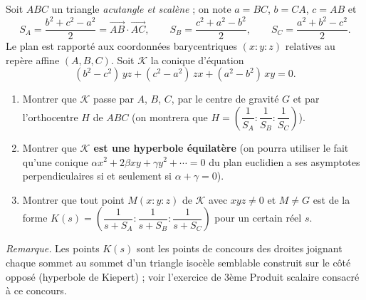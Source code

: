 
\newcommand{\R}{\mathbb{R}}

Soit $ABC$ un triangle \emph{acutangle et scalène} ; on note $a=BC$, $b=CA$, $c=AB$ et
\[S_A=\dfrac{b^2+c^2-a^2}{2}=\overrightarrow{AB}\cdot\overrightarrow{AC},\qquad S_B=\dfrac{c^2+a^2-b^2}{2},\qquad S_C=\dfrac{a^2+b^2-c^2}{2}.\]
Le plan est rapporté aux coordonnées barycentriques $(x:y:z)$ relatives au repère affine $(A,B,C)$. Soit $\mathcal K$ la conique d'équation
\[(b^2-c^2)\,yz+(c^2-a^2)\,zx+(a^2-b^2)\,xy=0.\]

\begin{enumerate}
  \item Montrer que $\mathcal K$ passe par $A$, $B$, $C$, par le centre de gravité $G$ et par l'orthocentre $H$ de $ABC$ (on montrera que $H=\left(\dfrac1{S_A}:\dfrac1{S_B}:\dfrac1{S_C}\right)$).
  \item Montrer que \textbf{$\mathcal K$ est une hyperbole équilatère} (on pourra utiliser le fait qu'une conique $\alpha x^2+2\beta xy+\gamma y^2+\cdots=0$ du plan euclidien a ses asymptotes perpendiculaires si et seulement si $\alpha+\gamma=0$).
  \item Montrer que tout point $M(x:y:z)$ de $\mathcal K$ avec $xyz\neq0$ et $M\neq G$ est de la forme $K(s)=\left(\dfrac1{s+S_A}:\dfrac1{s+S_B}:\dfrac1{s+S_C}\right)$ pour un certain réel $s$.
\end{enumerate}

\emph{Remarque.} Les points $K(s)$ sont les points de concours des droites joignant chaque sommet au sommet d'un triangle isocèle semblable construit sur le côté opposé (hyperbole de Kiepert) ; voir l'exercice de 3ème Produit scalaire consacré à ce concours.

